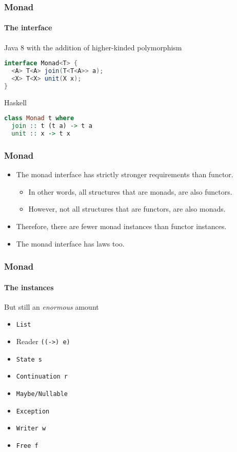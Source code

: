 \begin{frame}[fragile]
\frametitle{Monad}
\framesubtitle{The interface}
\begin{block}{Java 8 with the addition of higher-kinded polymorphism}
\begin{lstlisting}[style=language,language=java]
interface Monad<T> {
  <A> T<A> join(T<T<A>> a);
  <X> T<X> unit(X x);
}
\end{lstlisting}
\end{block}
\begin{block}{Haskell}
\begin{lstlisting}[style=language,language=haskell]
class Monad t where
  join :: t (t a) -> t a
  unit :: x -> t x
\end{lstlisting}
\end{block}
\end{frame}

\begin{frame}[fragile]
\frametitle{Monad}
\begin{itemize}
\item The monad interface has strictly stronger requirements than functor.
  \begin{itemize}
  \item In other words, all structures that are monads, are also functors.
  \item However, not all structures that are functors, are also monads.
  \end{itemize}
\item Therefore, there are fewer monad instances than functor instances.
\item The monad interface has laws too.
\end{itemize}
\end{frame}

\begin{frame}[fragile]
\frametitle{Monad}
\framesubtitle{The instances}
\begin{block}{But still an \emph{enormous} amount}
\begin{itemize}
\item \lstinline{List}
\item Reader \lstinline{((->) e)}
\item \lstinline{State s}
\item \lstinline{Continuation r}
\item \lstinline{Maybe/Nullable}
\item \lstinline{Exception}
\item \lstinline{Writer w}
\item \lstinline{Free f}
\end{itemize}
\end{block}
\end{frame}

